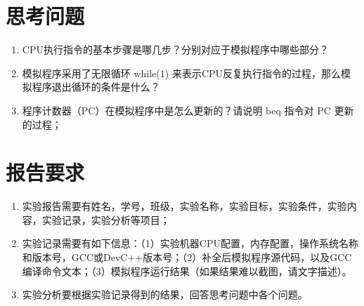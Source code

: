 \section{思考问题}

\begin{enumerate}
	\item CPU执行指令的基本步骤是哪几步？分别对应于模拟程序中哪些部分？
	\item 模拟程序采用了无限循环 while(1) 来表示CPU反复执行指令的过程，那么模拟程序退出循环的条件是什么？
	\item 程序计数器（PC）在模拟程序中是怎么更新的？请说明 beq 指令对 PC 更新的过程；
\end{enumerate}

\section{报告要求}

\begin{enumerate}
	\item 实验报告需要有姓名，学号，班级，实验名称，实验目标，实验条件，实验内容，实验记录，实验分析等项目；
	\item 实验记录需要有如下信息：（1）实验机器CPU配置，内存配置，操作系统名称和版本号，GCC或DevC++版本号；（2）补全后模拟程序源代码，以及GCC编译命令文本；（3）模拟程序运行结果（如果结果难以截图，请文字描述）。
	\item 实验分析要根据实验记录得到的结果，回答思考问题中各个问题。
\end{enumerate}

